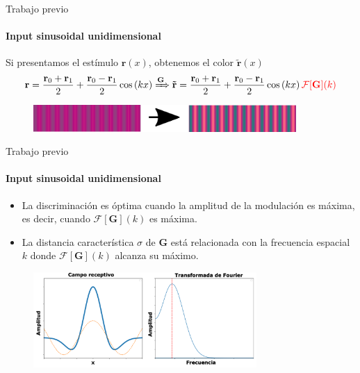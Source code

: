 \documentclass[
    11pt, %
    aspectratio=169, %
]{beamer}
\begin{document}
\begin{frame}{Trabajo previo}
    \framesubtitle{Input sinusoidal unidimensional}
    Si presentamos el estímulo $\mathbf{r}(x)$, 
    obtenemos el color $\mathbf{\tilde{r}}(x)$
    \begin{equation*}
 \mathbf{r} = \displaystyle\frac{\mathbf{r}_0 + \mathbf{r}_1}{2} + \displaystyle\frac{\mathbf{r}_0 - \mathbf{r}_1}{2}\cos{(kx)} \xRightarrow{\mathbf{G}} \mathbf{\tilde{r}} = \displaystyle\frac{\mathbf{r}_0 + \mathbf{r}_1}{2} + \displaystyle\frac{\mathbf{r}_0 - \mathbf{r}_1}{2}\cos{(kx)} \color{red} \, \mathcal{F}[\mathbf{G}](k)
\end{equation*}


\begin{figure}
    \centering
    \includegraphics[width = 10cm]{Images/coseno_estimulo_y_amplificado.png}
\end{figure}





\end{frame}


\begin{frame}{Trabajo previo}
    \framesubtitle{Input sinusoidal unidimensional}
\begin{itemize}
    \item La discriminación es óptima cuando la amplitud de la modulación es máxima, es decir, cuando $\mathcal{F}[\mathbf{G}](k)$ es máxima. \newline
    \item La distancia característica $\sigma$ de $\mathbf{G}$ está relacionada con la frecuencia espacial $k$ donde $\mathcal{F}[\mathbf{G}](k)$ alcanza su máximo.
\end{itemize}   

\begin{figure}
    \centering
    \includegraphics[width = 8.5cm]{Images/intro/fourier_transform_def.pdf}
\end{figure}



\end{frame}
\end{document}
